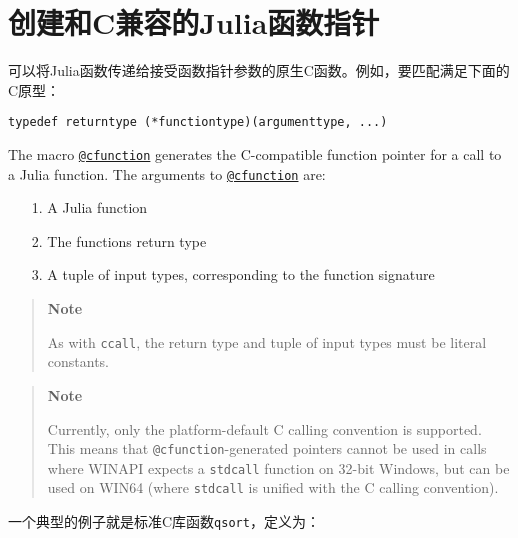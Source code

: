 \hypertarget{17519979972664810183}{}


\section{创建和C兼容的Julia函数指针}



可以将Julia函数传递给接受函数指针参数的原生C函数。例如，要匹配满足下面的C原型：




\begin{lstlisting}
typedef returntype (*functiontype)(argumenttype, ...)
\end{lstlisting}



The macro \hyperlink{11617107520401351255}{\texttt{@cfunction}} generates the C-compatible function pointer for a call to a Julia function. The arguments to \hyperlink{11617107520401351255}{\texttt{@cfunction}} are:



\begin{itemize}
\item[1. ] A Julia function


\item[2. ] The function{\textquotesingle}s return type


\item[3. ] A tuple of input types, corresponding to the function signature

\end{itemize}


\begin{quote}
\textbf{Note}

As with \texttt{ccall}, the return type and tuple of input types must be literal constants.

\end{quote}


\begin{quote}
\textbf{Note}

Currently, only the platform-default C calling convention is supported. This means that \texttt{@cfunction}-generated pointers cannot be used in calls where WINAPI expects a \texttt{stdcall} function on 32-bit Windows, but can be used on WIN64 (where \texttt{stdcall} is unified with the C calling convention).

\end{quote}


一个典型的例子就是标准C库函数\texttt{qsort}，定义为：





